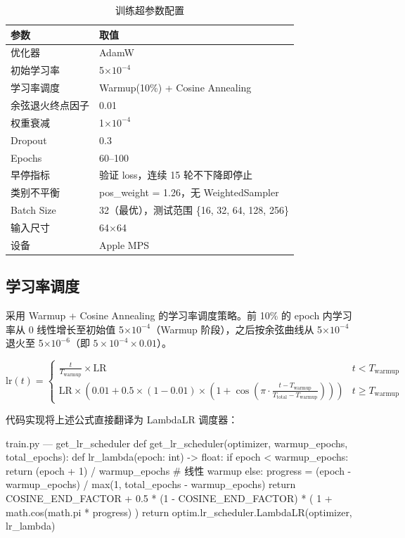 \documentclass[12pt,a4paper]{ctexart}
\begin{document}
\begin{table}[H]
\centering
\caption{训练超参数配置}
\begin{tabular}{ll}
\toprule
参数 & 取值 \\
\midrule
优化器 & AdamW \\
初始学习率 & 5$\times10^{-4}$ \\
学习率调度 & Warmup(10\%) + Cosine Annealing \\
余弦退火终点因子 & 0.01 \\
权重衰减 & 1$\times10^{-4}$ \\
Dropout & 0.3 \\
Epochs & 60--100 \\
早停指标 & 验证 loss，连续 15 轮不下降即停止 \\
类别不平衡 & pos\_weight = 1.26，无 WeightedSampler \\
Batch Size & 32（最优），测试范围 \{16, 32, 64, 128, 256\}\\
输入尺寸 & 64$\times$64 \\
设备 & Apple MPS \\
\bottomrule
\end{tabular}
\end{table}

\subsection{学习率调度}

采用 Warmup + Cosine Annealing 的学习率调度策略。前 10\% 的 epoch 内学习率从 0 线性增长至初始值 5$\times10^{-4}$（Warmup 阶段），之后按余弦曲线从 5$\times10^{-4}$ 退火至 5$\times10^{-6}$（即 $5\times10^{-4} \times 0.01$）。

\[
\text{lr}(t) = \begin{cases}
\displaystyle\frac{t}{T_{\text{warmup}}} \times \text{LR} & t < T_{\text{warmup}} \\[8pt]
\text{LR} \times \left(0.01 + 0.5 \times (1 - 0.01) \times \left(1 + \cos\left(\pi \cdot \frac{t - T_{\text{warmup}}}{T_{\text{total}} - T_{\text{warmup}}}\right)\right)\right) & t \geq T_{\text{warmup}}
\end{cases}
\]

代码实现将上述公式直接翻译为 LambdaLR 调度器：

\begin{pythoncode}{train.py — get\_lr\_scheduler}
def get_lr_scheduler(optimizer, warmup_epochs, total_epochs):
    def lr_lambda(epoch: int) -> float:
        if epoch < warmup_epochs:
            return (epoch + 1) / warmup_epochs   # 线性 warmup
        else:
            progress = (epoch - warmup_epochs) / max(1, total_epochs - warmup_epochs)
            return COSINE_END_FACTOR + 0.5 * (1 - COSINE_END_FACTOR) * (
                1 + math.cos(math.pi * progress)
            )
    return optim.lr_scheduler.LambdaLR(optimizer, lr_lambda)
\end{pythoncode}
\end{document}
